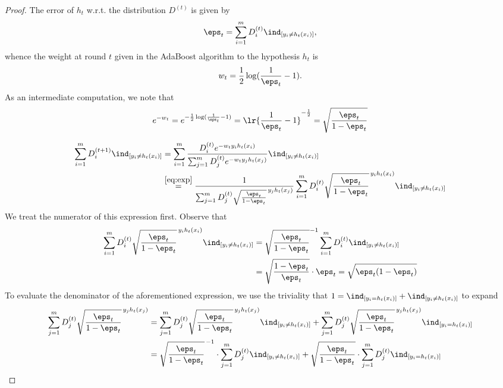 \documentclass[12pt]{article}
\begin{document}
\begin{proof}
  The error of $ h_{t} $ w.r.t. the distribution $ D^{(t)} $ is given by 
  \[
    \eps_{t} = \sum_{i=1}^{m}D_{i}^{(t)}\ind_{[y_{i}\neq h_{t}(x_{i})]},
  \]
  whence the weight at round $ t $ given in the AdaBoost algorithm to the hypothesis $ h_{t} $ is 
  \[
    w_{t} = \frac{1}{2}\log(\frac{1}{\eps_{t}}-1).
  \]
  As an intermediate computation, we note that 
  \begin{equation}\label{eq:exp}
    e^{-w_{t}} = e^{-\frac{1}{2}\log(\frac{1}{\eps_{t}}-1) } = \lr{\frac{1}{\eps_{t}}-1}^{-\frac{1}{2}} = \sqrt{\frac{\eps_{t}}{1-\eps_{t}}}
  \end{equation}

  \begin{align}\label{eq:errorexpansion}
    \sum_{i=1}^{m}D_{i}^{(t+1)}\ind_{[y_{i}\neq h_{t}(x_{i})]} &= \sum_{i=1}^{m} \frac{D_{i}^{(t)}e^{-w_{t}y_{i}h_{t}(x_{i})}}{\sum_{j=1}^{m}D_{j}^{(t)} e^{-w_{t}y_{j}h_{t}(x_{j})}} \ind_{[y_{i}\neq h_{t}(x_{i})]} \nonumber\\
    &\overset{\eqref{eq:exp}}{=} \frac{1}{\sum_{j=1}^{m}D_{j}^{(t)} \sqrt{\frac{\eps_{t}}{1-\eps_{t}}}^{\,y_{j}h_{t}(x_{j})}}\sum_{i=1}^{m} D_{i}^{(t)} \sqrt{\frac{\eps_{t}}{1-\eps_{t}}}^{\,y_{i}h_{t}(x_{i})} \ind_{[y_{i}\neq h_{t}(x_{i})]}
  \end{align}
  We treat the numerator of this expression first. Observe that
  \begin{align*}
    \sum_{i=1}^{m} D_{i}^{(t)} \sqrt{\frac{\eps_{t}}{1-\eps_{t}}}^{\,y_{i}h_{t}(x_{i})} \ind_{[y_{i}\neq h_{t}(x_{i})]} &= \sqrt{\frac{\eps_{t}}{1-\eps_{t}}}^{-1}\sum_{i=1}^{m} D_{i}^{(t)}  \ind_{[y_{i}\neq h_{t}(x_{i})]} \\
    &= \sqrt{\frac{1-\eps_{t}}{\eps_{t}}}\cdot \eps_{t} = \sqrt{\eps_{t}(1-\eps_{t})}
  \end{align*}
  To evaluate the denominator of the aforementioned expression, we use the triviality that $ 1 = \ind_{[y_{i}=h_{t}(x_{i})]} + \ind_{[y_{i}\neq h_{t}(x_{i})]} $ to expand 
  \begin{align*}
    \sum_{j=1}^{m}D_{j}^{(t)} \sqrt{\frac{\eps_{t}}{1-\eps_{t}}}^{\,y_{j}h_{t}(x_{j})} &= \sum_{j=1}^{m}D_{j}^{(t)} \sqrt{\frac{\eps_{t}}{1-\eps_{t}}}^{\,y_{j}h_{t}(x_{j})} \ind_{[y_{i}\neq h_{t}(x_{i})]} + \sum_{j=1}^{m}D_{j}^{(t)} \sqrt{\frac{\eps_{t}}{1-\eps_{t}}}^{\,y_{j}h_{t}(x_{j})} \ind_{[y_{i}=h_{t}(x_{i})]}\\
    &= \sqrt{\frac{\eps_{t}}{1-\eps_{t}}}^{\,-1}\cdot\sum_{j=1}^{m}D_{j}^{(t)}  \ind_{[y_{i}\neq h_{t}(x_{i})]} + \sqrt{\frac{\eps_{t}}{1-\eps_{t}}}\cdot\sum_{j=1}^{m}D_{j}^{(t)}  \ind_{[y_{i}=h_{t}(x_{i})]}\\

\end{align*}
\end{proof}
\end{document}
